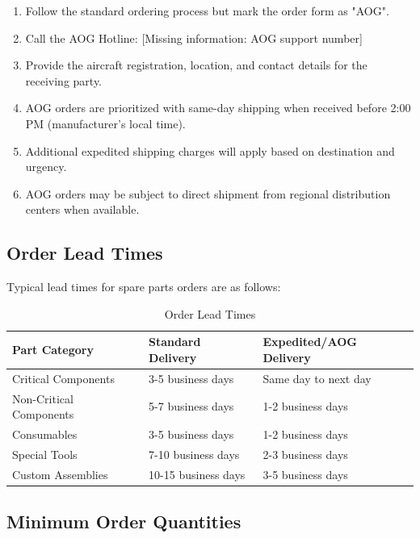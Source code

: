 \documentclass[12pt,a4paper,twoside,openright]{book}
\newcommand{\tabletextfont}{\normalfont\rmfamily}
\newcommand{\tableheadfont}{\normalfont\bfseries}
\begin{document}
\begin{enumerate}
    \item Follow the standard ordering process but mark the order form as "AOG".
    \item Call the AOG Hotline: {\color{missingred}[Missing information: AOG support number]}
    \item Provide the aircraft registration, location, and contact details for the receiving party.
    \item AOG orders are prioritized with same-day shipping when received before 2:00 PM (manufacturer's local time).
    \item Additional expedited shipping charges will apply based on destination and urgency.
    \item AOG orders may be subject to direct shipment from regional distribution centers when available.
\end{enumerate}

\subsection{Order Lead Times}

Typical lead times for spare parts orders are as follows:

\begin{table}[h]
\centering
\setlength{\tabcolsep}{5pt} %
\begin{tabular}{|p{}|p{}|p{}|}
\hline
\tableheadfont\textbf{Part Category} & \tableheadfont\textbf{Standard Delivery} & \tableheadfont\textbf{Expedited/AOG Delivery} \\
\hline
\tabletextfont Critical Components & 3-5 business days & Same day to next day \\
\hline
\tabletextfont Non-Critical Components & 5-7 business days & 1-2 business days \\
\hline
\tabletextfont Consumables & 3-5 business days & 1-2 business days \\
\hline
\tabletextfont Special Tools & 7-10 business days & 2-3 business days \\
\hline
\tabletextfont Custom Assemblies & 10-15 business days & 3-5 business days \\
\hline
\end{tabular}
\caption{Order Lead Times}
\end{table}

\subsection{Minimum Order Quantities}
\end{document}
